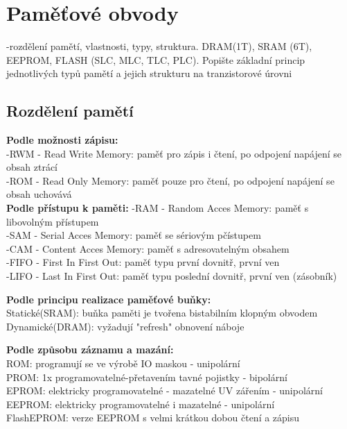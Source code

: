 \section{Paměťové obvody}
-rozdělení pamětí, vlastnosti, typy, struktura. DRAM(1T), SRAM (6T), EEPROM, FLASH (SLC, MLC, TLC, PLC). Popište základní princip jednotlivých typů pamětí a jejich strukturu na tranzistorové úrovni

\subsection{Rozdělení pamětí}
\textbf{Podle možnosti zápisu:}\\
-RWM - Read Write Memory: paměť pro zápis i čtení, po odpojení napájení se obsah ztrácí\\
-ROM - Read Only Memory: paměť pouze pro čtení, po odpojení napájení se obsah uchovává\\

\textbf{Podle přístupu k paměti:}
-RAM - Random Acces Memory: paměť s libovolným přístupem\\
-SAM - Serial Acces Memory: paměť se sériovým pčístupem\\
-CAM - Content Acces Memory: paměť s adresovatelným obsahem\\
-FIFO - First In First Out: paměť typu první dovnitř, první ven\\
-LIFO - Last In First Out: paměť typu poslední dovnitř, první ven (zásobník)

\textbf{Podle principu realizace paměťové buňky:}\\
Statické(SRAM): buňka paměti je tvořena bistabilním klopným obvodem\\
Dynamické(DRAM): vyžadují "refresh" obnovení náboje

\textbf{Podle způsobu záznamu a mazání:}\\
ROM: programují se ve výrobě IO maskou - unipolární\\
PROM: 1x programovatelné-přetavením tavné pojistky - bipolární\\
EPROM: elektricky programovatelné - mazatelné UV zářením - unipolární\\
EEPROM: elektricky programovatelné i mazatelné - unipolární\\
FlashEPROM: verze EEPROM s velmi krátkou dobou čtení a zápisu\\
\newpage
